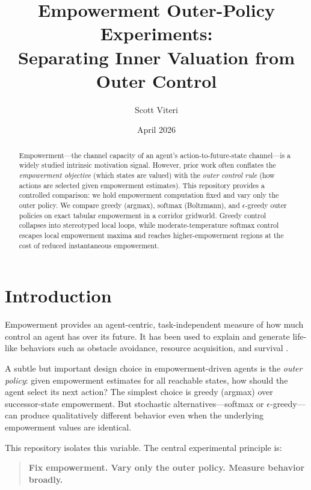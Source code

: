 \documentclass[11pt]{article}
\title{Empowerment Outer-Policy Experiments:\\
  Separating Inner Valuation from Outer Control}
\author{Scott Viteri}
\date{April 2026}
\begin{document}
\maketitle

\begin{abstract}
Empowerment---the channel capacity of an agent's action-to-future-state
channel---is a widely studied intrinsic motivation signal.  However, prior
work often conflates the \emph{empowerment objective} (which states are
valued) with the \emph{outer control rule} (how actions are selected given
empowerment estimates).  This repository provides a controlled comparison:
we hold empowerment computation fixed and vary only the outer policy.
We compare greedy (argmax), softmax (Boltzmann), and $\epsilon$-greedy
outer policies on exact tabular empowerment in a corridor gridworld.
Greedy control collapses into stereotyped local loops, while moderate-temperature
softmax control escapes local empowerment maxima and reaches higher-empowerment
regions at the cost of reduced instantaneous empowerment.
\end{abstract}

\section{Introduction}
\label{sec:intro}

Empowerment \cite{klyubin2005empowerment} provides an agent-centric,
task-independent measure of how much control an agent has over its
future.  It has been used to explain and generate life-like behaviors
such as obstacle avoidance, resource acquisition, and survival
\cite{jung2011empowerment, mohamed2015variational, ramirez2024mop}.

A subtle but important design choice in empowerment-driven agents is the
\emph{outer policy}: given empowerment estimates for all reachable
states, how should the agent select its next action?  The simplest
choice is greedy (argmax) over successor-state empowerment.  But
stochastic alternatives---softmax or $\epsilon$-greedy---can produce
qualitatively different behavior even when the underlying empowerment
values are identical.

This repository isolates this variable.  The central experimental
principle is:

\begin{quote}
\textbf{Fix empowerment.  Vary only the outer policy.  Measure behavior broadly.}
\end{quote}
\end{document}
